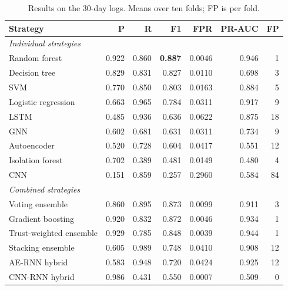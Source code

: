 \begin{table}[H]
\centering
\small
\begin{tabular}{lrrrrrr}
\toprule
Strategy & P & R & F1 & FPR & PR-AUC & FP \\
\midrule
\multicolumn{7}{l}{\textit{Individual strategies}} \\
Random forest & 0.922 & 0.860 & \textbf{0.887} & 0.0046 & 0.946 & 1 \\
Decision tree & 0.829 & 0.831 & 0.827 & 0.0110 & 0.698 & 3 \\
SVM & 0.770 & 0.850 & 0.803 & 0.0163 & 0.884 & 5 \\
Logistic regression & 0.663 & 0.965 & 0.784 & 0.0311 & 0.917 & 9 \\
LSTM & 0.485 & 0.936 & 0.636 & 0.0622 & 0.875 & 18 \\
GNN & 0.602 & 0.681 & 0.631 & 0.0311 & 0.734 & 9 \\
Autoencoder & 0.520 & 0.728 & 0.604 & 0.0417 & 0.551 & 12 \\
Isolation forest & 0.702 & 0.389 & 0.481 & 0.0149 & 0.480 & 4 \\
CNN & 0.151 & 0.859 & 0.257 & 0.2960 & 0.584 & 84 \\
\midrule
\multicolumn{7}{l}{\textit{Combined strategies}} \\
Voting ensemble & 0.860 & 0.895 & 0.873 & 0.0099 & 0.911 & 3 \\
Gradient boosting & 0.920 & 0.832 & 0.872 & 0.0046 & 0.934 & 1 \\
Trust-weighted ensemble & 0.929 & 0.785 & 0.848 & 0.0039 & 0.944 & 1 \\
Stacking ensemble & 0.605 & 0.989 & 0.748 & 0.0410 & 0.908 & 12 \\
AE-RNN hybrid & 0.583 & 0.948 & 0.720 & 0.0424 & 0.925 & 12 \\
CNN-RNN hybrid & 0.986 & 0.431 & 0.550 & 0.0007 & 0.509 & 0 \\
\bottomrule
\end{tabular}
\caption{Results on the 30-day logs. Means over ten folds; FP is per fold.}
\label{tab:results-month}
\end{table}
